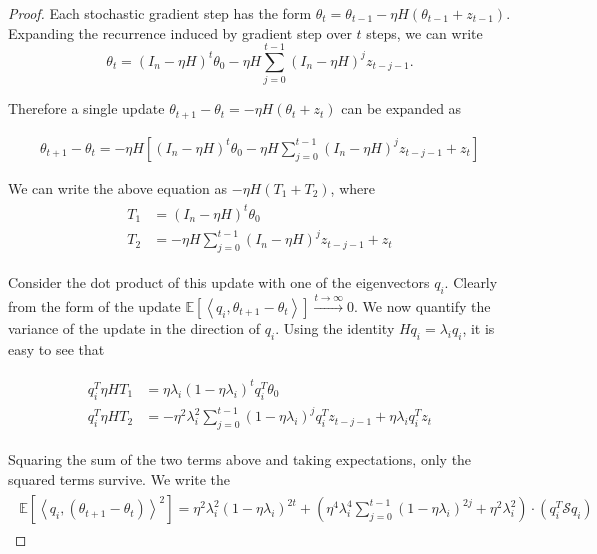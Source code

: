 \documentclass{article}
\newcommand{\Noise}{\mathcal{S}}
\newcommand{\E}[1]{\mathbb{E}\left[#1\right]}
\begin{document}
\begin{proof}
Each stochastic gradient step has the form
$\theta_t = \theta_{t-1} - \eta H (\theta_{t-1} + z_{t-1})$.
Expanding the recurrence induced by gradient step over $t$ steps, we can write
$$\theta_t = (I_n - \eta H)^t \theta_0 - \eta H \sum_{j=0}^{t-1} (I_n - \eta H)^j z_{t-j-1}.
$$

Therefore a single update $\theta_{t+1} - \theta_t = -\eta H (\theta_t + z_t)$ can be expanded as

\begin{align*}
\theta_{t+1} - \theta_t = - \eta H [(I_n - \eta H)^t \theta_0 
- \eta H \sum_{j=0}^{t-1} (I_n - \eta H)^j z_{t-j-1} + z_t]
\end{align*}

We can write the above equation as $ -\eta H ( T_1 + T_2)$, where
\begin{align*}
\begin{split}
T_1 &= (I_n - \eta H)^t \theta_0 \\
T_2 &= - \eta H \sum_{j=0}^{t-1} (I_n - \eta H)^j z_{t-j-1} + z_t
\end{split}
\end{align*}

Consider the dot product of this update with one of the eigenvectors $q_i$. Clearly from the form of the update $\E{\left<q_i, \theta_{t+1} - \theta_t \right>} \xrightarrow{t \rightarrow \infty} 0$. We now quantify the variance of the update in the direction of $q_i$. Using the identity $H q_i = \lambda_i q_i$, it is easy to see that

\begin{align*}
\begin{split}
q_i^T \eta H T_1 &= \eta \lambda_i (1 - \eta \lambda_i)^t q_i^T \theta_0 \\
q_i^T \eta H T_2 &= - \eta^2 \lambda_i^2 \sum_{j=0}^{t-1} (1 - \eta \lambda_i)^j q_i^T z_{t-j-1} + \eta \lambda_i q_i^T z_t
\end{split}
\end{align*}

Squaring the sum of the two terms above and taking expectations, only the squared terms survive. We write the 
\begin{align*}
\begin{split}
 \E{\left< q_i, (\theta_{t+1} - \theta_t) \right>^2} =  \eta^2 \lambda_i^2 (1 - \eta \lambda_i)^{2t} 
 +  \left( \eta^4 \lambda_i^4 \sum_{j=0}^{t-1} (1 - \eta \lambda_i)^{2j} + \eta^2 \lambda_i^2 \right) \cdot (q_i^T \Noise q_i)
\end{split}
\end{align*}


\end{proof}
\end{document}
